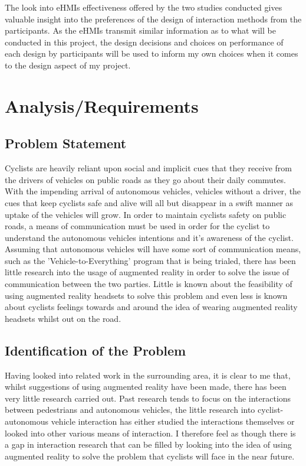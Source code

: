 \documentclass{l4proj}
\begin{document}
The look into eHMIs effectiveness offered by the two studies conducted gives valuable insight into the preferences of the design of interaction methods from the participants. As the eHMIs transmit similar information as to what will be conducted in this project, the design decisions and choices on performance of each design by participants will be used to inform my own choices when it comes to the design aspect of my project.


\chapter{Analysis/Requirements}

\section{Problem Statement}

Cyclists are heavily reliant upon social and implicit cues that they receive from the drivers of vehicles on public roads as they go about their daily commutes. With the impending arrival of autonomous vehicles, vehicles without a driver, the cues that keep cyclists safe and alive will all but disappear in a swift manner as uptake of the vehicles will grow. In order to maintain cyclists safety on public roads, a means of communication must be used in order for the cyclist to understand the autonomous vehicles intentions and it's awareness of the cyclist. Assuming that autonomous vehicles will have some sort of communication means, such as the 'Vehicle-to-Everything' program that is being trialed, there has been little research into the usage of augmented reality in order to solve the issue of communication between the two parties. Little is known about the feasibility of using augmented reality headsets to solve this problem and even less is known about cyclists feelings towards and around the idea of wearing augmented reality headsets whilst out on the road.

\section{Identification of the Problem}

Having looked into related work in the surrounding area, it is clear to me that, whilst suggestions of using augmented reality have been made, there has been very little research carried out. Past research tends to focus on the interactions between pedestrians and autonomous vehicles, the little research into cyclist-autonomous vehicle interaction has either studied the interactions themselves or looked into other various means of interaction. I therefore feel as though there is a gap in interaction research that can be filled by looking into the idea of using augmented reality to solve the problem that cyclists will face in the near future.
\end{document}
